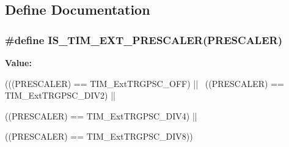 \subsection{Define Documentation}
\hypertarget{group__TIM__External__Trigger__Prescaler_ga615587e6aae397d9fe8166004e7324f2}{
\subsubsection[{IS\_\-TIM\_\-EXT\_\-PRESCALER}]{\setlength{\rightskip}{0pt plus 5cm}\#define IS\_\-TIM\_\-EXT\_\-PRESCALER(PRESCALER)}}
\label{group__TIM__External__Trigger__Prescaler_ga615587e6aae397d9fe8166004e7324f2}
{\bfseries Value:}
\begin{DoxyCode}
(((PRESCALER) == TIM_ExtTRGPSC_OFF) || \
                                         ((PRESCALER) == TIM_ExtTRGPSC_DIV2) || \
      
                                         ((PRESCALER) == TIM_ExtTRGPSC_DIV4) || \
      
                                         ((PRESCALER) == TIM_ExtTRGPSC_DIV8))
\end{DoxyCode}

